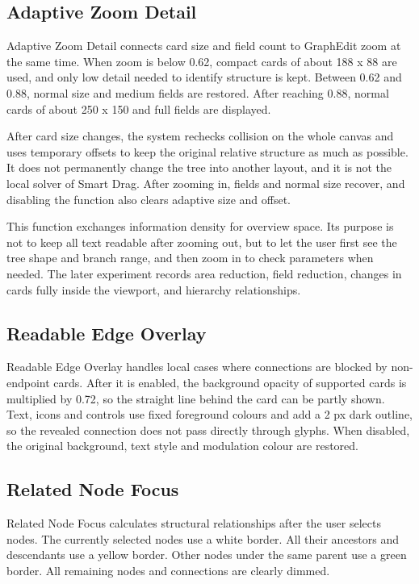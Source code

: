 \documentclass[11pt,a4paper,oneside,extrafontsizes]{memoir}
\begin{document}
\subsection{Adaptive Zoom Detail}

Adaptive Zoom Detail connects card size and field count to GraphEdit zoom at the same time. When zoom is below 0.62, compact cards of about 188 x 88 are used, and only low detail needed to identify structure is kept. Between 0.62 and 0.88, normal size and medium fields are restored. After reaching 0.88, normal cards of about 250 x 150 and full fields are displayed.

After card size changes, the system rechecks collision on the whole canvas and uses temporary offsets to keep the original relative structure as much as possible. It does not permanently change the tree into another layout, and it is not the local solver of Smart Drag. After zooming in, fields and normal size recover, and disabling the function also clears adaptive size and offset.

This function exchanges information density for overview space. Its purpose is not to keep all text readable after zooming out, but to let the user first see the tree shape and branch range, and then zoom in to check parameters when needed. The later experiment records area reduction, field reduction, changes in cards fully inside the viewport, and hierarchy relationships.

\subsection{Readable Edge Overlay}

Readable Edge Overlay handles local cases where connections are blocked by non-endpoint cards. After it is enabled, the background opacity of supported cards is multiplied by 0.72, so the straight line behind the card can be partly shown. Text, icons and controls use fixed foreground colours and add a 2 px dark outline, so the revealed connection does not pass directly through glyphs. When disabled, the original background, text style and modulation colour are restored.

\subsection{Related Node Focus}

Related Node Focus calculates structural relationships after the user selects nodes. The currently selected nodes use a white border. All their ancestors and descendants use a yellow border. Other nodes under the same parent use a green border. All remaining nodes and connections are clearly dimmed.
\end{document}
